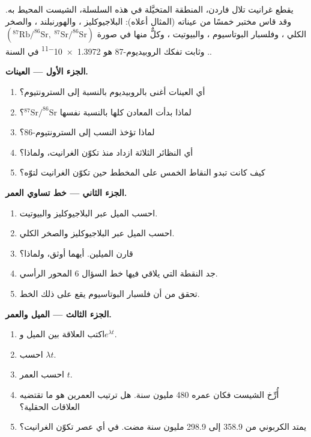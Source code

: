 \begin{problem}
\label{pb:g12:age-of-the-earth:1}
يقطع غرانيت تلال فاردن، المنطقة المتخيَّلة في هذه السلسلة،
الشيست المحيط به. وقد قاس مختبر خمسًا من عيناته (المثال أعلاه):
البلاجيوكليز ، والهورنبلند ،
والصخر الكلي ، وفلسبار البوتاسيوم ، والبيوتيت ، وكلٌّ منها في صورة
$(^{87}\mathrm{Rb}/^{86}\mathrm{Sr},\ ^{87}\mathrm{Sr}/^{86}\mathrm{Sr})$. وثابت
تفكك الروبيديوم-87 هو \num{1.3972e-11} في السنة.

\medskip
\noindent\textbf{الجزء الأول --- العينات.}
\begin{enumerate}
  \item أي العينات أغنى بالروبيديوم بالنسبة إلى السترونتيوم؟
  \item لماذا بدأت المعادن كلها بالنسبة نفسها
        $^{87}\mathrm{Sr}/^{86}\mathrm{Sr}$؟
  \item لماذا تؤخذ النسب إلى السترونتيوم-86؟
  \item أي النظائر الثلاثة ازداد منذ تكوّن الغرانيت، ولماذا؟
  \item كيف كانت تبدو النقاط الخمس على المخطط حين
        تكوّن الغرانيت لتوّه؟
\end{enumerate}

\medskip
\noindent\textbf{الجزء الثاني --- خط تساوي العمر.}
\begin{enumerate}[resume]
  \item احسب الميل عبر البلاجيوكليز والبيوتيت.
  \item احسب الميل عبر البلاجيوكليز والصخر الكلي.
  \item قارن الميلين. أيهما أوثق، ولماذا؟
  \item جد النقطة التي يلاقي فيها خط السؤال 6 المحور الرأسي.
  \item تحقق من أن فلسبار البوتاسيوم يقع على ذلك الخط.
\end{enumerate}

\medskip
\noindent\textbf{الجزء الثالث --- الميل والعمر.}
\begin{enumerate}[resume]
  \item اكتب العلاقة بين الميل و$e^{\lambda t}$.
  \item احسب $\lambda t$.
  \item احسب العمر $t$.
  \item أُرِّخ الشيست فكان عمره 480 مليون سنة. هل ترتيب
        العمرين هو ما تقتضيه العلاقات الحقلية؟
  \item يمتد الكربوني من 358.9 إلى 298.9 مليون سنة مضت. في
        أي عصر تكوّن الغرانيت؟
\end{enumerate}


\end{problem}
